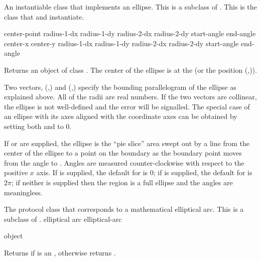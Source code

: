 
An instantiable class that implements an ellipse.  This is a subclass of
.  This is the class that  and 
instantiate.
\Immutable

  {center-point 
                        radius-1-dx radius-1-dy radius-2-dx radius-2-dy
                        \key start-angle end-angle}
 {center-x center-y 
                        radius-1-dx radius-1-dy radius-2-dx radius-2-dy 
                        \key start-angle end-angle}

Returns an object of class .  The center of the ellipse is
at the   (or the position
(,)).

Two vectors, (,) and
(,) specify the bounding parallelogram of the
ellipse as explained above.  All of the radii are real numbers.  If the two
vectors are collinear, the ellipse is not well-defined and the
 error will be signalled.  The special case of an
ellipse with its axes aligned with the coordinate axes can be obtained by
setting both  and  to 0.

If  or  are supplied, the ellipse is the ``pie
slice'' area swept out by a line from the center of the ellipse to a point on
the boundary as the boundary point moves from the angle  to
.  Angles are measured counter-clockwise with respect to the
positive $x$ axis.  If  is supplied, the default for
 is $0$; if  is supplied, the default for
 is $2\pi$; if neither is supplied then the region is a full
ellipse and the angles are meaningless.

\MayCaptureInputs



The protocol class that corresponds to a mathematical elliptical arc.  This is a
subclass of .
 {elliptical arc} {elliptical-arc}

 {object}

Returns  if  is an , otherwise
returns .


